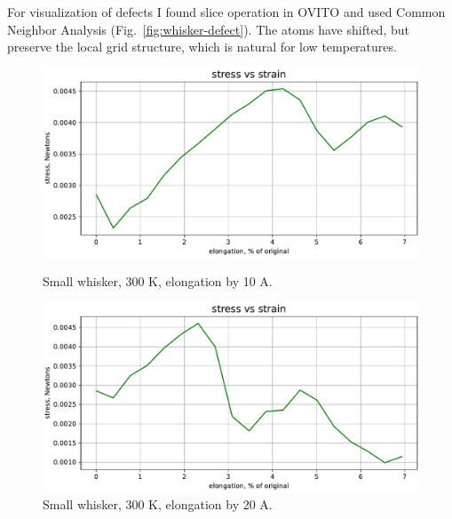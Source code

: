 \documentclass[12pt,a4paper]{article}
\begin{document}
For visualization of defects I found slice operation in OVITO and used Common Neighbor Analysis (Fig.~\ref{fig:whisker-defect}). The atoms have shifted, but preserve the local grid structure, which is natural for low temperatures.

\begin{figure}[h!]
	\centering
	\includegraphics[width=.85\linewidth]{img/milestone09-small-300-10.pdf}
	\caption{Small whisker, 300 K, elongation by 10 A.}
	\includegraphics[width=.85\linewidth]{img/milestone09-small-300-20.pdf}
	\caption{Small whisker, 300 K, elongation by 20 A.}
	\label{fig:whisker-300}
\end{figure}
\end{document}
